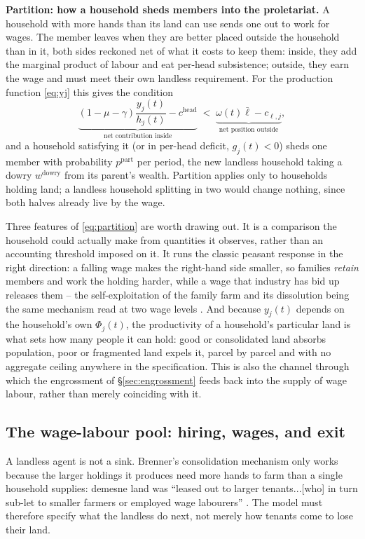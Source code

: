 \documentclass[11pt,english]{article}
\begin{document}
\textbf{Partition: how a household sheds members into the proletariat.} A household with more hands than its land can use sends one out to work for wages. The member leaves when they are better placed outside the household than in it, both sides reckoned net of what it costs to keep them: inside, they add the marginal product of labour and eat per-head subsistence; outside, they earn the wage and must meet their own landless requirement. For the production function \eqref{eq:yj} this gives the condition
\begin{equation}
\underbrace{(1-\mu-\gamma)\frac{y_j(t)}{h_j(t)} - c^{\text{head}}}_{\text{net contribution inside}} \;<\; \underbrace{\omega(t)\bar\ell - c_{\ell,j}}_{\text{net position outside}},
\label{eq:partition}
\end{equation}
and a household satisfying it (or in per-head deficit, $g_j(t)<0$) sheds one member with probability $p^{\text{part}}$ per period, the new landless household taking a dowry $w^{\text{dowry}}$ from its parent's wealth. Partition applies only to households holding land; a landless household splitting in two would change nothing, since both halves already live by the wage.

Three features of \eqref{eq:partition} are worth drawing out. It is a comparison the household could actually make from quantities it observes, rather than an accounting threshold imposed on it. It runs the classic peasant response in the right direction: a falling wage makes the right-hand side smaller, so families \emph{retain} members and work the holding harder, while a wage that industry has bid up releases them -- the self-exploitation of the family farm and its dissolution being the same mechanism read at two wage levels \cite{chayanov1966theory}. And because $y_j(t)$ depends on the household's own $\Phi_j(t)$, the productivity of a household's particular land is what sets how many people it can hold: good or consolidated land absorbs population, poor or fragmented land expels it, parcel by parcel and with no aggregate ceiling anywhere in the specification. This is also the channel through which the engrossment of \S\ref{sec:engrossment} feeds back into the supply of wage labour, rather than merely coinciding with it.

\subsection{The wage-labour pool: hiring, wages, and exit}
\label{sec:labour}

A landless agent is not a sink. Brenner's consolidation mechanism only works because the larger holdings it produces need more hands to farm than a single household supplies: demesne land was ``leased out to larger tenants...[who] in turn sub-let to smaller farmers or employed wage labourers'' \cite[p.61]{brenner1976agrarian}. The model must therefore specify what the landless do next, not merely how tenants come to lose their land.
\end{document}
